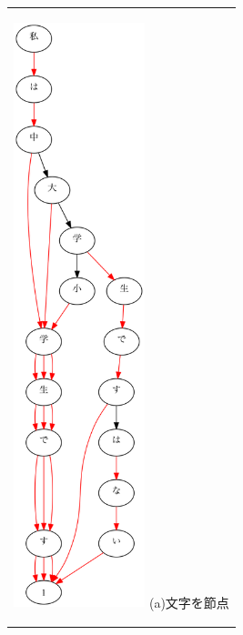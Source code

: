 \documentclass[12pt,twoside, fleqn]{ujbook}
\begin{document}
	\begin{figure}[htbp]
	\begin{center}
	\begin{tabular}{c}
		\begin{minipage}{0.3\hsize}
			\begin{center}
			\includegraphics [clip, height=17cm]{./img/example_graph_word1.png}
			\hspace{1.6cm} (a)文字を節点
			\end{center}
		\end{minipage}


\end{tabular}
\end{center}
\end{figure}
\end{document}
